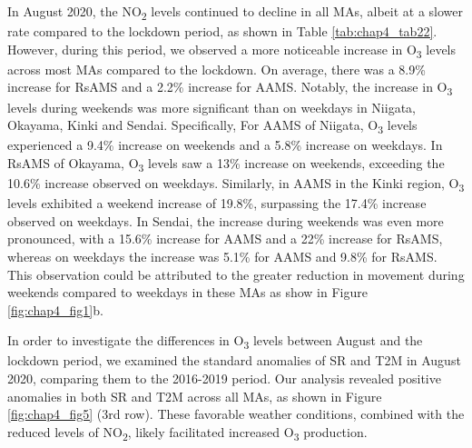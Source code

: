 In August 2020, the NO\textsubscript{2} levels continued to decline in all MAs, albeit at a slower rate compared to the lockdown period, as shown in Table \ref{tab:chap4_tab22}. However, during this period, we observed a more noticeable increase in O\textsubscript{3} levels across most MAs compared to the lockdown. On average, there was a 8.9\% increase for RsAMS and a 2.2\% increase for AAMS. Notably, the increase in O\textsubscript{3} levels during weekends was more significant than on weekdays in Niigata, Okayama, Kinki and Sendai. Specifically, For AAMS of Niigata, O\textsubscript{3} levels experienced a 9.4\% increase on weekends and a 5.8\% increase on weekdays. In RsAMS of Okayama, O\textsubscript{3} levels saw a 13\% increase on weekends, exceeding the 10.6\% increase observed on weekdays. Similarly, in AAMS in the Kinki region, O\textsubscript{3} levels exhibited a weekend increase of 19.8\%, surpassing the 17.4\% increase observed on weekdays. In Sendai, the increase during weekends was even more pronounced, with a 15.6\% increase for AAMS and a 22\% increase for RsAMS, whereas on weekdays the increase was 5.1\% for AAMS and 9.8\% for RsAMS. This observation could be attributed to the greater reduction in movement during weekends compared to weekdays in these MAs as show in Figure \ref{fig:chap4_fig1}b. \par
In order to investigate the differences in O\textsubscript{3} levels between August and the lockdown period, we examined the standard anomalies of SR and T2M in August 2020, comparing them to the 2016-2019 period. Our analysis revealed positive anomalies in both SR and T2M across all MAs, as shown in Figure \ref{fig:chap4_fig5} (3rd row). These favorable weather conditions, combined with the reduced levels of NO\textsubscript{2}, likely facilitated increased O\textsubscript{3} production. \par

